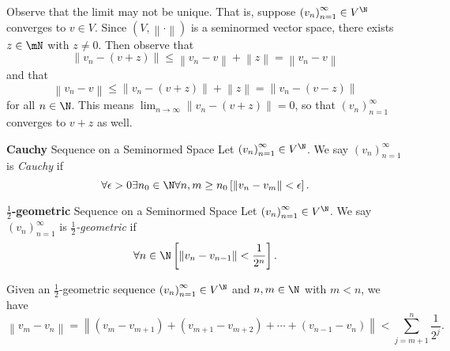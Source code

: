 \documentclass[pmath450]{subfiles}
\begin{document}
    \np Observe that the limit may not be unique. That is, suppose $\left( v_{n} \right)^{\infty}_{n=1}\in V^{\N}$ converges to $v\in V$. Since $\left( V,\left\lVert \cdot\right\rVert \right)$ is a seminormed vector space, there exists $z\in\mN$ with $z\neq 0$. Then observe that
    \begin{equation*}
        \left\lVert v_n-\left( v+z \right)\right\rVert \leq \left\lVert v_n-v\right\rVert + \left\lVert z\right\rVert = \left\lVert v_n-v\right\rVert
    \end{equation*}
    and that
    \begin{equation*}
        \left\lVert v_n-v\right\rVert \leq \left\lVert v_n-\left( v+z \right)\right\rVert + \left\lVert z\right\rVert = \left\lVert v_n-\left( v-z \right)\right\rVert
    \end{equation*}
    for all $n\in\N$. This means $\lim_{n\to\infty}\left\lVert v_n-\left( v+z \right)\right\rVert=0$, so that $\left( v_{n} \right)^{\infty}_{n=1}$ converges to $v+z$ as well.
    
    \begin{definition}{\textbf{Cauchy} Sequence on a Seminormed Space}
        Let $\left( v_{n} \right)^{\infty}_{n=1}\in V^{\N}$. We say $\left( v_{n} \right)^{\infty}_{n=1}$ is \emph{Cauchy} if
        \begin{equation*}
            \forall\epsilon>0\exists n_0\in\N\forall n,m\geq n_0\left[ \left\lVert v_n-v_m\right\rVert<\epsilon \right].
        \end{equation*}
    \end{definition}
    
    \begin{definition}{\textbf{$\frac{1}{2}$-geometric} Sequence on a Seminormed Space}
        Let $\left( v_{n} \right)^{\infty}_{n=1}\in V^{\N}$. We say $\left( v_{n} \right)^{\infty}_{n=1}$ is $\frac{1}{2}$\emph{-geometric} if
        \begin{equation*}
            \forall n\in\N\left[ \left\lVert v_n-v_{n-1}\right\rVert<\frac{1}{2^n} \right].
        \end{equation*}
    \end{definition}
    
    \np Given an $\frac{1}{2}$-geometric sequence $\left( v_{n} \right)^{\infty}_{n=1}\in V^{\N}$ and $n,m\in\N$ with $m<n$, we have
    \begin{equation*}
        \left\lVert v_m-v_n\right\rVert = \left\lVert \left( v_m-v_{m+1} \right)+\left( v_{m+1}-v_{m+2} \right)+\cdots+\left( v_{n-1}-v_n \right)\right\rVert < \sum^{n}_{j=m+1} \frac{1}{2^j}.
    \end{equation*}
    
\end{document}
